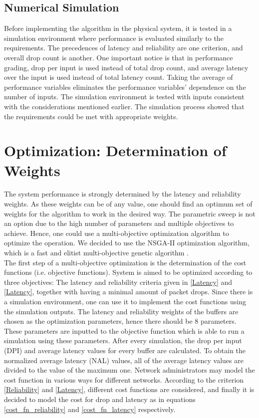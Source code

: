 \documentclass[journal,twoside]{IEEEtran}
\begin{document}
\subsection{Numerical Simulation}
\indent Before implementing the algorithm in the physical system, it is tested in a simulation environment where performance is evaluated similarly to the requirements. The precedences of latency and reliability are one criterion, and overall drop count is another. One important notice is that in performance grading, drop per input is used instead of total drop count, and average latency over the input is used instead of total latency count. Taking the average of performance variables eliminates the performance variables' dependence on the number of inputs. The simulation environment is tested with inputs consistent with the considerations mentioned earlier. The simulation process showed that the requirements could be met with appropriate weights.


\section{Optimization: Determination of Weights}

The system performance is strongly determined by the latency and reliability weights. As these weights can be of any value, one should find an optimum set of weights for the algorithm to work in the desired way. The parametric sweep is not an option due to the high number of parameters and multiple objectives to achieve. Hence, one could use a multi-objective optimization algorithm to optimize the operation. We decided to use the NSGA-II optimization algorithm, which is a fast and elitist multi-objective genetic algorithm \cite{NSGA}.\\

\indent The first step of a multi-objective optimization is the determination of the cost functions (i.e. objective functions). System is aimed to be optimized according to three objectives: The latency and reliability criteria given in \ref{Latency} and \ref{Latency}, together with having a minimal amount of packet drops. Since there is a simulation environment, one can use it to implement the cost functions using the simulation outputs. The latency and reliability weights of the buffers are chosen as the optimization parameters, hence there should be 8 parameters. These parameters are inputted to the objective function which is able to run a simulation using these parameters. After every simulation, the drop per input (DPI) and average latency values for every buffer are calculated. To obtain the normalized average latency (NAL) values, all of the average latency values are divided to the value of the maximum one. Network administrators may model the cost function in various ways for different networks. According to the criterion \ref{Reliability} and \ref{Latency}, different cost functions are considered, and finally it is decided to model the cost for drop and latency as in equations \ref{cost_fn_reliability} and \ref{cost_fn_latency} respectively.
\end{document}
